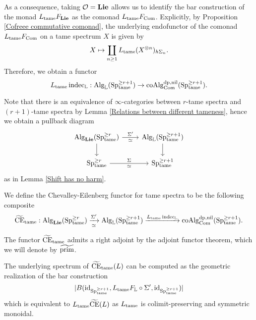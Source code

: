 As a consequence, taking $\CO=\spLie$ allows us to identify the bar construction of the monad $L_{\tame}F_{\spLie}$ as the comonad $L_{\tame}F_{\Com}$. Explicitly, by Proposition \ref{Cofreee commutative comonad}, the underlying endofunctor of the comonad $L_{\tame}F_{\Com}$ on a tame spectrum $X$ is given by
$$
X \mapsto \coprod_{n\geq 1} L_{\tame} (X^{\otimes n})_{h\Sigma_n}.
$$
Therefore, we obtain a functor 
$$
L_{\tame} \indec_{\BL}:
\Alg_{\BL}(\Sp^{\geq r+1}_{\tame})
\to
\coAlg^{\divpow, \nil}_{\Com}(\Sp^{\geq r+1}_{\tame}).
$$

Note that there is an equivalence of $\infty$-categories between $r$-tame spectra and $(r+1)$-tame spectra by Lemma \ref{Relations between different tameness}, hence we obtain a pullback diagram 
\[
    \begin{tikzcd}
	\Alg_{\spLie}(\Sp^{\geq r}_{\tame})    & \Alg_{\BL}(\Sp^{\geq r+1}_{\tame})\\
	 \Sp^{\geq r}_{\tame} & \Sp^{\geq r+1}_{\tame}
	\arrow[from=1-1, to = 1-2, "\Sigma'", "\simeq" below]
	\arrow[from=1-1 , to =2-1,  left]
	\arrow[from=1-2 , to =2-2,  right]
	\arrow[from=2-1, to=2-2, "\Sigma", "\simeq" below]
\end{tikzcd}
\]
as in Lemma \ref{Shift has no harm}.

\begin{definition}
\label{Chevalley-Eilenberg functor for tame spectra}
We define the Chevalley-Eilenberg functor for tame spectra
to be the following composite
$$
\tildeCE_{\tame}: \Alg_{\spLie}(\Sp^{\geq r}_{\tame})
\xrightarrow[\simeq]{\Sigma'}
\Alg_{\BL}(\Sp^{\geq r+1}_{\tame})
\xrightarrow{L_{\tame} \indec_{\BL}}
\coAlg^{\divpow, \nil}_{\Com}(\Sp^{\geq r+1}_{\tame}).
$$
\end{definition}

\begin{definition}
The functor $\tildeCE_{\tame}$ admits a right adjoint by the adjoint functor theorem, which we will denote by $\widetilde{\Prim}$.
\end{definition}



\begin{remark}
\label{Formula for computing CE_tame(L)}
The underlying spectrum of $\tildeCE_{\tame}(L)$ can be computed as the geometric realization of the bar construction 
$$
|B(\id_{\Sp^{\geq r+1}_{\tame}}, L_{\tame}F_{\BL}\circ \Sigma', \id_{\Sp^{\geq r+1}_{\tame}})|
$$
which is equivalent to $L_{\tame}\tildeCE(L)$ as $L_{\tame}$ is colimit-preserving and symmetric monoidal.
\end{remark}

